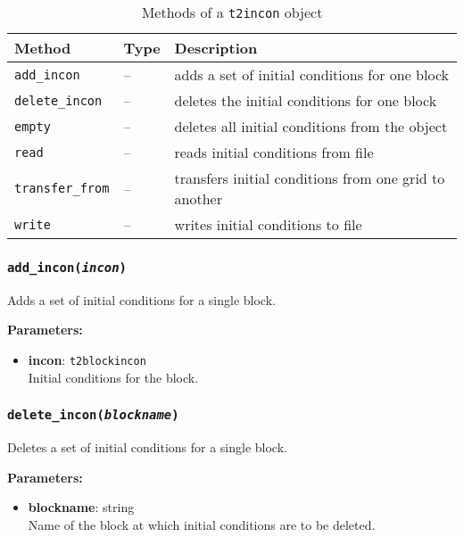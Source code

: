 \begin{table}
  \begin{center}
    \begin{tabular}{|l|l|p{65mm}|}
      \hline
      \textbf{Method} & \textbf{Type} & \textbf{Description}\\
      \hline
      \texttt{add\_incon} & -- & adds a set of initial conditions for one block\\
      \texttt{delete\_incon} & -- & deletes the initial conditions for one block\\
      \texttt{empty} & -- & deletes all initial conditions from the object\\
      \texttt{read} & -- & reads initial conditions from file\\
      \texttt{transfer\_from} & -- & transfers initial conditions from one grid to another\\
      \texttt{write} & -- & writes initial conditions to file\\
      \hline
    \end{tabular}
    \caption{Methods of a \texttt{t2incon} object}
    \label{tb:t2incon_methods}
  \end{center}
\end{table}

\subsubsection{\texttt{add\_incon(\emph{incon})}}

Adds a set of initial conditions for a single block.

\textbf{Parameters:}
\begin{itemize}
\item \textbf{incon}: \texttt{t2blockincon}\\
  Initial conditions for the block.
\end{itemize}

\subsubsection{\texttt{delete\_incon(\emph{blockname})}}

Deletes a set of initial conditions for a single block.

\textbf{Parameters:}
\begin{itemize}
\item \textbf{blockname}: string\\
  Name of the block at which initial conditions are to be deleted.
\end{itemize}

